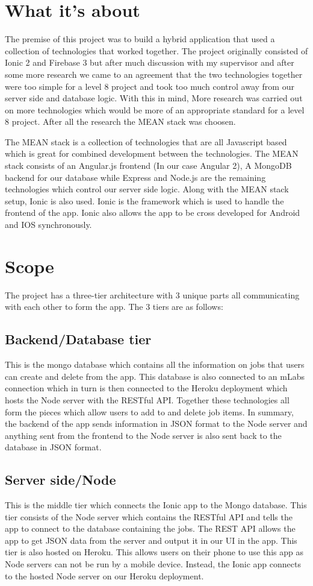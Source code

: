 \section {What it’s about}
The premise of this project was to build a hybrid application that used a collection of technologies that worked together. The project originally consisted of Ionic 2 and Firebase 3 but after much discussion with my supervisor and after some more research we came to an agreement that the two technologies together were too simple for a level 8 project and took too much control away from our server side and database logic. With this in mind, More research was carried out on more technologies which would be more of an appropriate standard for a level 8 project. After all the research  the MEAN stack\cite{Mean-Stack} was choosen.

The MEAN stack is a collection of technologies that are all Javascript based which is great for combined development between the technologies. The MEAN stack consists of an Angular.js frontend (In our case Angular 2), A MongoDB backend for our database while Express and Node.js are the remaining technologies which control our server side logic. Along with the MEAN stack setup, Ionic is also used. Ionic is the framework which is used to handle the frontend of the app. Ionic also allows the app to be cross developed for Android and IOS synchronously.

\section{Scope}
The project has a three-tier architecture with 3 unique parts all communicating with each other to form the app. The 3 tiers are as follows:
\subsection{Backend/Database tier}
This is the mongo database which contains all the information on jobs that users can create and delete from the app. This database is also connected to an mLabs connection which in turn is then connected to the Heroku deployment which hosts the Node server with the RESTful API. Together these technologies all form the pieces which allow users to add to and delete job items. In summary, the backend of the app sends information in JSON format to the Node server and anything sent from the frontend to the Node server is also sent back to the database in JSON format.

\subsection{Server side/Node}
This is the middle tier which connects the Ionic app to the Mongo database.  This tier consists of the Node server which contains the RESTful API and tells the app to connect to the database containing the jobs. The REST API allows the app to get JSON data from the server and output it in our UI in the app. This tier is also hosted on Heroku. This allows users on their phone to use this app as Node servers can not be run by a mobile device. Instead, the Ionic app connects to the hosted Node server on our Heroku deployment. 

